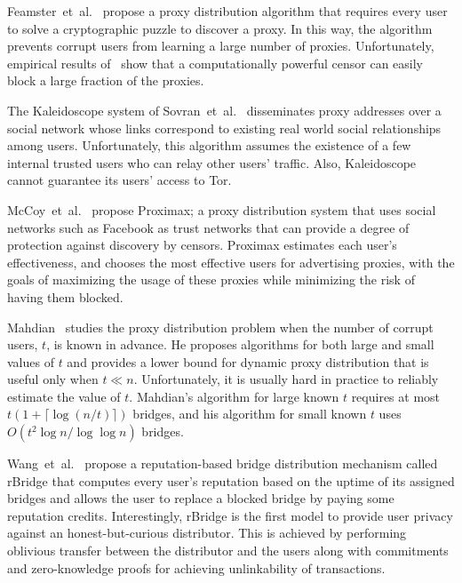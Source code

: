 \documentclass{sig-alternate-05-2015}
\newcommand{\etal}{et~al.}
\newcommand{\eg}{e.g.}
\begin{document}
Feamster~\etal~\cite{Feamster:PETS:2003} propose a proxy distribution algorithm that requires every user to solve a cryptographic puzzle to discover a proxy. In this way, the algorithm prevents corrupt users from learning a large number of proxies. Unfortunately, empirical results of~\cite{Feamster:PETS:2003} show that a computationally powerful censor can easily block a large fraction of the proxies.

The Kaleidoscope system of Sovran~\etal~\cite{Sovran:2008:PSN} disseminates proxy addresses over a social network whose links correspond to existing real world social relationships among users. Unfortunately, this algorithm assumes the existence of a few internal trusted users who can relay other users' traffic. Also, Kaleidoscope cannot guarantee its users' access to Tor.

McCoy~\etal~\cite{McCoy:FC:2011} propose Proximax; a proxy distribution system that uses social networks such as Facebook as trust networks that can provide a degree of protection against discovery by censors. Proximax estimates each user's effectiveness, and chooses the most effective users for advertising proxies, with the goals of maximizing the usage of these proxies while minimizing the risk of having them blocked.

Mahdian~\cite{Mahdian:2010} studies the proxy distribution problem when the number of corrupt users, $t$, is known in advance. He proposes algorithms for both large and small values of $t$ and provides a lower bound for dynamic proxy distribution that is useful only when ${t \ll n}$.
Unfortunately, it is usually hard in practice to reliably estimate the value of $t$. Mahdian's algorithm for large known $t$ requires at most ${t\left(1 + \lceil \log{(n/t)} \rceil \right)}$ bridges, and his algorithm for small known $t$ uses ${O(t^2 \log{n} / \log{\log{n}})}$ bridges.

Wang~\etal~\cite{WangLBH:rBridge:13} propose a reputation-based bridge distribution mechanism called rBridge that computes every user's reputation based on the uptime of its assigned bridges and allows the user to replace a blocked bridge by paying some reputation credits. Interestingly, rBridge is the first model to provide user privacy against an honest-but-curious distributor. This is achieved by performing oblivious transfer between the distributor and the users along with commitments and zero-knowledge proofs for achieving unlinkability of transactions.
\end{document}
